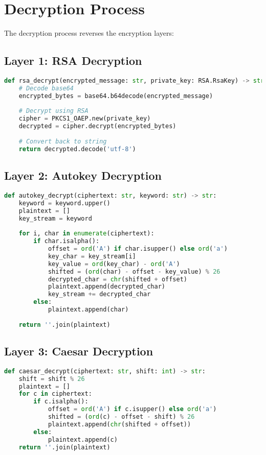 \documentclass[12pt,a4paper]{article}
\begin{document}
\section{Decryption Process}
The decryption process reverses the encryption layers:

\subsection{Layer 1: RSA Decryption}
\begin{lstlisting}[language=Python]
def rsa_decrypt(encrypted_message: str, private_key: RSA.RsaKey) -> str:
    # Decode base64
    encrypted_bytes = base64.b64decode(encrypted_message)
    
    # Decrypt using RSA
    cipher = PKCS1_OAEP.new(private_key)
    decrypted = cipher.decrypt(encrypted_bytes)
    
    # Convert back to string
    return decrypted.decode('utf-8')
\end{lstlisting}

\subsection{Layer 2: Autokey Decryption}
\begin{lstlisting}[language=Python]
def autokey_decrypt(ciphertext: str, keyword: str) -> str:
    keyword = keyword.upper()
    plaintext = []
    key_stream = keyword
    
    for i, char in enumerate(ciphertext):
        if char.isalpha():
            offset = ord('A') if char.isupper() else ord('a')
            key_char = key_stream[i]
            key_value = ord(key_char) - ord('A')
            shifted = (ord(char) - offset - key_value) % 26
            decrypted_char = chr(shifted + offset)
            plaintext.append(decrypted_char)
            key_stream += decrypted_char
        else:
            plaintext.append(char)
    
    return ''.join(plaintext)
\end{lstlisting}

\subsection{Layer 3: Caesar Decryption}
\begin{lstlisting}[language=Python]
def caesar_decrypt(ciphertext: str, shift: int) -> str:
    shift = shift % 26
    plaintext = []
    for c in ciphertext:
        if c.isalpha():
            offset = ord('A') if c.isupper() else ord('a')
            shifted = (ord(c) - offset - shift) % 26
            plaintext.append(chr(shifted + offset))
        else:
            plaintext.append(c)
    return ''.join(plaintext)
\end{lstlisting}
\end{document}
